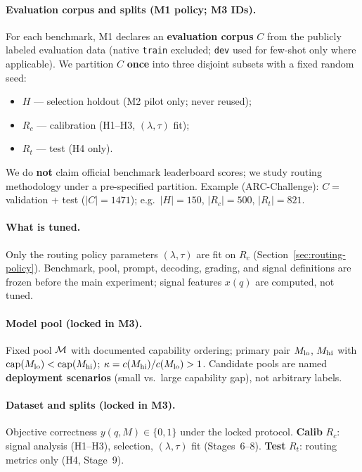 \paragraph{Evaluation corpus and splits (M1 policy; M3 IDs).}
For each benchmark, M1 declares an \textbf{evaluation corpus} $C$ from the publicly labeled evaluation data (native \texttt{train} excluded; \texttt{dev} used for few-shot only where applicable).
We partition $C$ \textbf{once} into three disjoint subsets with a fixed random seed:
\begin{itemize}
  \item $H$ --- selection holdout (M2 pilot only; never reused);
  \item $R_c$ --- calibration (H1--H3, $(\lambda,\tau)$ fit);
  \item $R_t$ --- test (H4 only).
\end{itemize}
We do \textbf{not} claim official benchmark leaderboard scores; we study routing methodology under a pre-specified partition.
Example (ARC-Challenge): $C =$ validation + test ($|C|=1471$); e.g.\ $|H|=150$, $|R_c|=500$, $|R_t|=821$.

\paragraph{What is tuned.}
Only the routing policy parameters $(\lambda,\tau)$ are fit on $R_c$ (Section~\ref{sec:routing-policy}).
Benchmark, pool, prompt, decoding, grading, and signal definitions are frozen before the main experiment; signal features $x(q)$ are computed, not tuned.

\paragraph{Model pool (locked in M3).}
Fixed pool $\mathcal{M}$ with documented capability ordering; primary pair $M_{\mathrm{lo}}$, $M_{\mathrm{hi}}$ with $\mathrm{cap}(M_{\mathrm{lo}})<\mathrm{cap}(M_{\mathrm{hi}})$; $\kappa = c(M_{\mathrm{hi}})/c(M_{\mathrm{lo}}) > 1$.
Candidate pools are named \textbf{deployment scenarios} (small vs.\ large capability gap), not arbitrary labels.

\paragraph{Dataset and splits (locked in M3).}
Objective correctness $y(q,M)\in\{0,1\}$ under the locked protocol.
\textbf{Calib} $R_c$: signal analysis (H1--H3), selection, $(\lambda,\tau)$ fit (Stages~6--8).
\textbf{Test} $R_t$: routing metrics only (H4, Stage~9).

